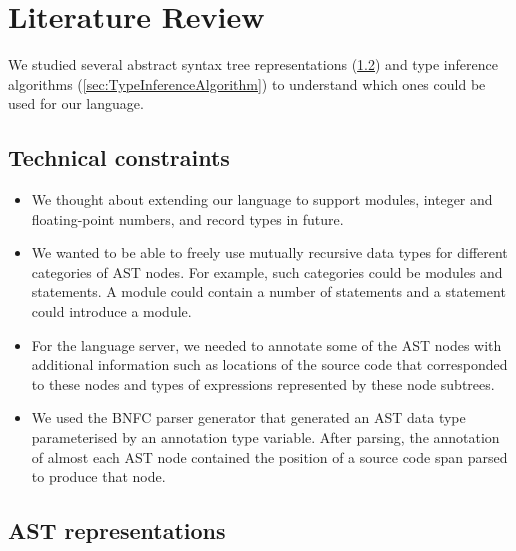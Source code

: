 \chapter{Literature Review}
\label{chap:LiteratureReview}

We studied several abstract syntax tree representations (\cref{sec:AstRepresentations}) and type inference algorithms (\cref{sec:TypeInferenceAlgorithm}) to understand which ones could be used for our language.


\section{Technical constraints}
\label{chap:LiteratureReview:sec:AstRepresentations:TechnicalConstraints}

\begin{itemize}
    \item We thought about extending our language to support modules, integer and floating-point numbers, and record types in future.
    \item We wanted to be able to freely use mutually recursive data types for different categories of AST nodes. For example, such categories could be modules and statements. A module could contain a number of statements and a statement could introduce a module.
    \item For the language server, we needed to annotate some of the AST nodes with additional information such as locations of the source code that corresponded to these nodes and types of expressions represented by these node subtrees.
    \item We used the BNFC parser generator that generated an AST data type parameterised by an annotation type variable.
          After parsing, the annotation of almost each AST node contained the position of a source code span parsed to produce that node.
\end{itemize}

\section{AST representations}
\label{sec:AstRepresentations}


